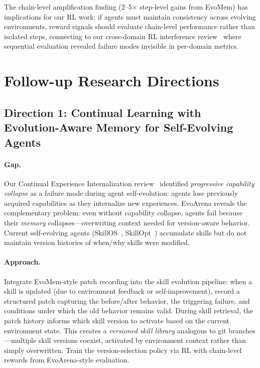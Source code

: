 \documentclass[11pt,a4paper]{article}
\begin{document}
The chain-level amplification finding (2--5$\times$ step-level gains from EvoMem) has implications for our RL work: if agents must maintain consistency across evolving environments, reward signals should evaluate chain-level performance rather than isolated steps, connecting to our cross-domain RL interference review~\cite{liu2026crossdomain} where sequential evaluation revealed failure modes invisible in per-domain metrics.

\section{Follow-up Research Directions}

\subsection{Direction 1: Continual Learning with Evolution-Aware Memory for Self-Evolving Agents}

\paragraph{Gap.} Our Continual Experience Internalization review~\cite{liu2026continual} identified \emph{progressive capability collapse} as a failure mode during agent self-evolution: agents lose previously acquired capabilities as they internalize new experiences. EvoArena reveals the complementary problem: even without capability collapse, agents fail because their \emph{memory} collapses---overwriting context needed for version-aware behavior. Current self-evolving agents (SkillOS~\cite{chen2026skillos}, SkillOpt~\cite{li2026skillopt}) accumulate skills but do not maintain version histories of when/why skills were modified.

\paragraph{Approach.} Integrate EvoMem-style patch recording into the skill evolution pipeline: when a skill is updated (due to environment feedback or self-improvement), record a structured patch capturing the before/after behavior, the triggering failure, and conditions under which the old behavior remains valid. During skill retrieval, the patch history informs which skill version to activate based on the current environment state. This creates a \emph{versioned skill library} analogous to git branches---multiple skill versions coexist, activated by environment context rather than simply overwritten. Train the version-selection policy via RL with chain-level rewards from EvoArena-style evaluation.
\end{document}
